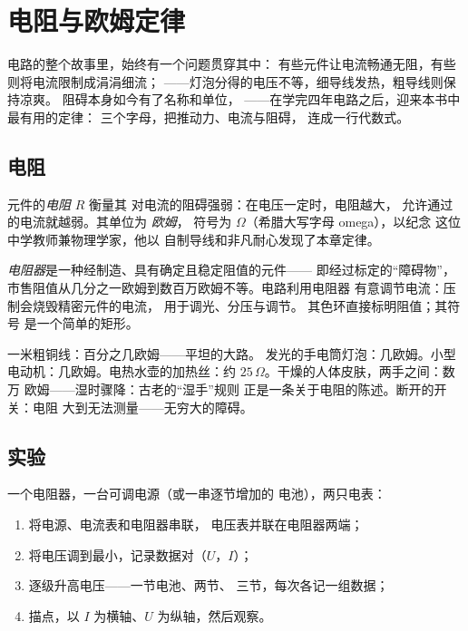 \chapter{电阻与欧姆定律}\label{ch:g8:ohms-law}

电路的整个故事里，始终有一个问题贯穿其中：
有些元件让电流畅通无阻，有些则将电流限制成涓涓细流；
——灯泡分得的电压不等，细导线发热，粗导线则保持凉爽。
阻碍本身如今有了名称和单位，
——在学完四年电路之后，迎来本书中最有用的定律：
三个字母，把推动力、电流与阻碍，
连成一行代数式。

\section{电阻}

\begin{definition}[电阻]\label{def:g8:ohms-law:resistance}
元件的\emph{电阻} $R$ 衡量其
对电流的阻碍强弱：在电压一定时，电阻越大，
允许通过的电流就越弱。其单位为
\emph{欧姆}，
符号为 $\Omega$（希腊大写字母 omega），以纪念
这位中学教师兼物理学家，他以
自制导线和非凡耐心发现了本章定律。
\end{definition}

\begin{definition}[电阻器]\label{def:g8:ohms-law:resistor}
\emph{电阻器}是一种经制造、具有确定且稳定阻值的元件——
即经过标定的“障碍物”，
市售阻值从几分之一欧姆到数百万欧姆不等。电路利用电阻器
有意调节电流：压制会烧毁精密元件的电流，
用于调光、分压与调节。
其色环直接标明阻值；其符号
是一个简单的矩形。
\end{definition}

\begin{example}[身边的电阻]\label{ex:g8:ohms-law:values}
一米粗铜线：百分之几欧姆——平坦的大路。
发光的手电筒灯泡：几欧姆。小型
电动机：几欧姆。电热水壶的加热丝：约
$25\,\Omega$。干燥的人体皮肤，两手之间：数万
欧姆——湿时骤降：古老的“湿手”规则
正是一条关于电阻的陈述。断开的开关：电阻
大到无法测量——无穷大的障碍。
\end{example}

\section{实验}

\begin{method}\label{met:g8:ohms-law:portrait}
一个电阻器，一台可调电源（或一串逐节增加的
电池），两只电表：
\begin{enumerate}
  \item 将电源、电流表和电阻器串联，
        电压表并联在电阻器两端；
  \item 将电压调到最小，记录数据对（$U$，$I$）；
  \item 逐级升高电压——一节电池、两节、
        三节，每次各记一组数据；
  \item 描点，以 $I$ 为横轴、$U$ 为纵轴，然后观察。
\end{enumerate}
\end{method}

